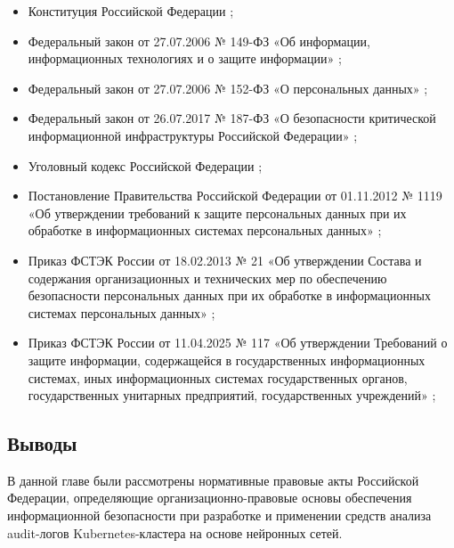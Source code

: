\begin{itemize}
    \item Конституция Российской Федерации \cite{ConstitutionRF};
    \item Федеральный закон от 27.07.2006 № 149-ФЗ «Об информации, информационных технологиях и о защите информации» \cite{FZ149};
    \item Федеральный закон от 27.07.2006 № 152-ФЗ «О персональных данных» \cite{FZ152};
    \item Федеральный закон от 26.07.2017 № 187-ФЗ «О безопасности критической информационной инфраструктуры Российской Федерации» \cite{FZ187};
    \item Уголовный кодекс Российской Федерации \cite{UKRF};
    \item Постановление Правительства Российской Федерации от 01.11.2012 № 1119 «Об утверждении требований к защите персональных данных при их обработке в информационных системах персональных данных» \cite{PP1119};
    \item Приказ ФСТЭК России от 18.02.2013 № 21 «Об утверждении Состава и содержания организационных и технических мер по обеспечению безопасности персональных данных при их обработке в информационных системах персональных данных» \cite{FSTEK21};
    \item Приказ ФСТЭК России от 11.04.2025 № 117 «Об утверждении Требований о защите информации, содержащейся в государственных информационных системах, иных информационных системах государственных органов, государственных унитарных предприятий, государственных учреждений» \cite{FSTEK117};
\end{itemize}











\subsection{Выводы}

В данной главе были рассмотрены нормативные правовые акты Российской Федерации, определяющие организационно-правовые основы обеспечения информационной безопасности при разработке и применении средств анализа audit-логов Kubernetes-кластера на основе нейронных сетей.

